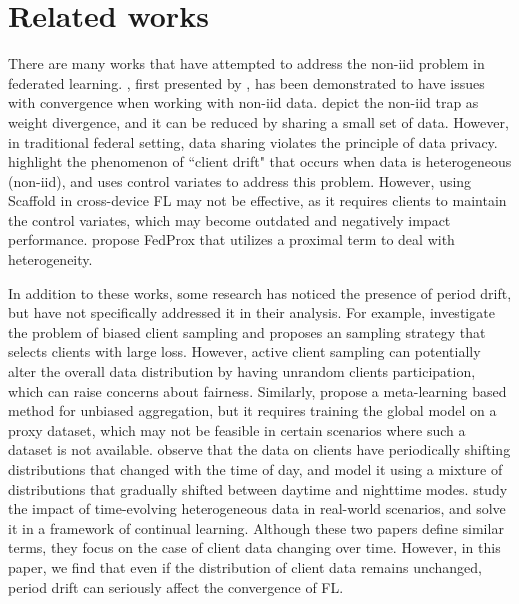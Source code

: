 \section{Related works} %
There are many works that have attempted to address the non-iid problem in federated learning.
\fedavg, first presented by \citet{mcmahan2017communication}, has been demonstrated to have issues with convergence when working with non-iid data. \citet{zhao2018federated} depict the non-iid trap as weight divergence, and it can be reduced by sharing a small set of data. However, in traditional federal setting, data sharing violates the principle of data privacy. \citet{karimireddy2021scaffold} highlight the phenomenon of ``client drift" that occurs when data is heterogeneous (non-iid), and uses control variates to address this problem. However, using Scaffold in cross-device FL may not be effective, as it requires clients to maintain the control variates, which may become outdated and negatively impact performance. \citet{li2020federated} propose FedProx that utilizes a proximal term to deal with heterogeneity.   

In addition to these works, some research has noticed the presence of period drift, but have not specifically addressed it in their analysis. For example, \citet{cho2022towards, fraboni2023general} investigate the problem of biased client sampling and proposes an sampling strategy that selects clients with large loss. However, active client sampling can potentially alter the overall data distribution by having unrandom clients participation, which can raise concerns about fairness. Similarly, \citet{yao2019federated} propose a meta-learning based method for unbiased aggregation, but it requires training the global model on a proxy dataset, which may not be feasible in certain scenarios where such a dataset is not available. \citet{zhu2022diurnal} observe that the data on clients have periodically shifting distributions that changed with the time of day, and model it using a mixture of distributions that gradually shifted between daytime and nighttime modes. \citet{guo2021towards} study the impact of time-evolving heterogeneous data in real-world scenarios, and solve it in a framework of continual learning. Although these two papers define similar terms, they focus on the case of client data changing over time. However, in this paper, we find that even if the distribution of client data remains unchanged, period drift can seriously affect the convergence of FL.